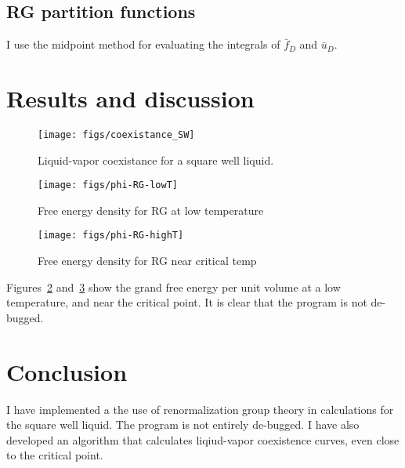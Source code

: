 \documentclass[letterpaper,twocolumn,amsmath,amssymb,prb]{revtex4-1}
\newcommand{\1}{\ensuremath{\textbf{r}_1}}
\newcommand{\2}{\ensuremath{\textbf{r}_2}}
\newcommand{\3}{\ensuremath{\textbf{r}_3}}
\newcommand{\4}{\ensuremath{\textbf{r}_4}}
\begin{document}
\subsection{RG partition functions}\label{subsec:fbar-ubar}
I use the midpoint method for evaluating the integrals of $\bar{f}_D$ and $\bar{u}_D$.

\section{Results and discussion}

\begin{figure}
  \begin{center}
  \texttt{[image: figs/coexistance\_SW]}
  \end{center}
  \caption{Liquid-vapor coexistance for a square well liquid.}
  \label{fig:coexistance_SW}
\end{figure}

\begin{figure}
  \begin{center}
  \texttt{[image: figs/phi-RG-lowT]}
  \end{center}
  \caption{Free energy density for RG at low temperature}
  \label{fig:phi-RG-lowT}
\end{figure}

\begin{figure}
  \begin{center}
  \texttt{[image: figs/phi-RG-highT]}
  \end{center}
  \caption{Free energy density for RG near critical temp}
  \label{fig:phi-RG-highT}
\end{figure}

Figures~\ref{fig:phi-RG-lowT} and~\ref{fig:phi-RG-highT} show the grand free energy per unit volume at a low temperature, and near the critical point. It is clear that the program is not de-bugged.



\section{Conclusion}
I have implemented a the use of renormalization group theory in calculations for the square well liquid. The program is not entirely de-bugged. I have also developed an algorithm that calculates liqiud-vapor coexistence curves, even close to the critical point.



\end{document}
